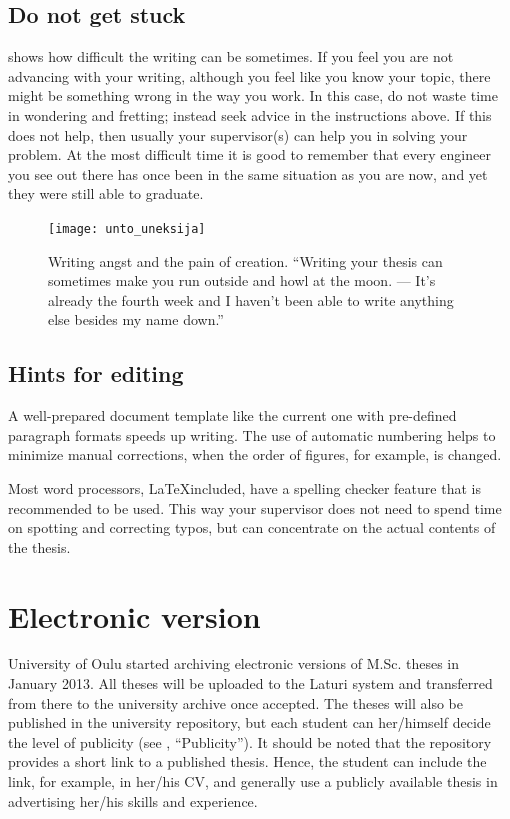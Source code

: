 \subsection{Do not get stuck}

 shows how difficult the writing can be sometimes. If you feel you are not advancing with your writing, although you feel like you know your topic, there might be something wrong in the way you work. In this case, do not waste time in wondering and fretting; instead seek advice in the instructions above. If this does not help, then usually your supervisor(s) can help you in solving your problem. At the most difficult time it is good to remember that every engineer you see out there has once been in the same situation as you are now, and yet they were still able to graduate.

\begin{figure}[ht]
  \begin{center}
    \texttt{[image: unto\_uneksija]}
  \end{center}
  \caption{Writing angst and the pain of creation. “Writing your thesis can sometimes
make you run outside and howl at the moon. --- It’s already the fourth week and I
haven’t been able to write anything else besides my name down.”}
  \label{fig:unto_uneksija}
\end{figure}

\subsection{Hints for editing}

A well-prepared document template like the current one with pre-defined paragraph formats speeds up writing. The use of automatic numbering helps to minimize manual corrections, when the order of figures, for example, is changed.

Most word processors, \LaTeX included, have a spelling checker feature that is recommended to be used. This way your supervisor does not need to spend time on spotting and correcting typos, but can concentrate on the actual contents of the thesis.

\section{Electronic version}

University of Oulu started archiving electronic versions of M.Sc. theses in January 2013. All theses will be uploaded to the Laturi system and transferred from there to the university archive once accepted. The theses will also be published in the university repository, but each student can her/himself decide the level of publicity (see , “Publicity”). It should be noted that the repository provides a short link to a published thesis. Hence, the student can include the link, for example, in her/his CV, and generally use a publicly available thesis in advertising her/his skills and experience.

